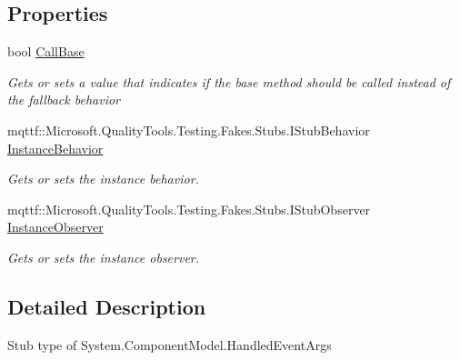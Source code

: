 \subsection*{Properties}
\begin{DoxyCompactItemize}
\item 
bool \hyperlink{class_system_1_1_component_model_1_1_fakes_1_1_stub_handled_event_args_a5c6c957027a35ae696dae942d2612359}{Call\-Base}
\begin{DoxyCompactList}\small\item\em Gets or sets a value that indicates if the base method should be called instead of the fallback behavior\end{DoxyCompactList}\item 
mqttf\-::\-Microsoft.\-Quality\-Tools.\-Testing.\-Fakes.\-Stubs.\-I\-Stub\-Behavior \hyperlink{class_system_1_1_component_model_1_1_fakes_1_1_stub_handled_event_args_aebe2e0a6f64bfe938a641f7c8b28bac1}{Instance\-Behavior}
\begin{DoxyCompactList}\small\item\em Gets or sets the instance behavior.\end{DoxyCompactList}\item 
mqttf\-::\-Microsoft.\-Quality\-Tools.\-Testing.\-Fakes.\-Stubs.\-I\-Stub\-Observer \hyperlink{class_system_1_1_component_model_1_1_fakes_1_1_stub_handled_event_args_ab062263efa1764ddbdd4bd921f1a7102}{Instance\-Observer}
\begin{DoxyCompactList}\small\item\em Gets or sets the instance observer.\end{DoxyCompactList}\end{DoxyCompactItemize}


\subsection{Detailed Description}
Stub type of System.\-Component\-Model.\-Handled\-Event\-Args




